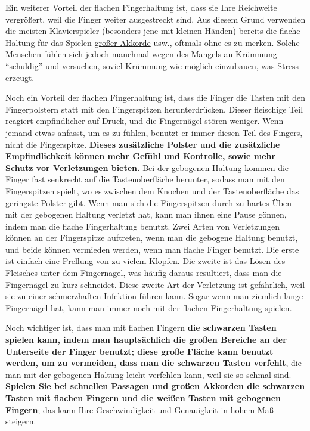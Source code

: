 Ein weiterer Vorteil der flachen Fingerhaltung ist, dass sie Ihre Reichweite vergrößert, weil die Finger weiter ausgestreckt sind.
Aus diesem Grund verwenden die meisten Klavierspieler (besonders jene mit kleinen Händen) bereits die flache Haltung für das Spielen \hyperref[c1iii7e]{großer Akkorde} usw., oftmals ohne es zu merken.
Solche Menschen fühlen sich jedoch manchmal wegen des Mangels an Krümmung \enquote{schuldig} und versuchen, soviel Krümmung wie möglich einzubauen, was Stress erzeugt.

Noch ein Vorteil der flachen Fingerhaltung ist, dass die Finger die Tasten mit den Fingerpolstern statt mit den Fingerspitzen herunterdrücken.
Dieser fleischige Teil reagiert empfindlicher auf Druck, und die Fingernägel stören weniger.
Wenn jemand etwas anfasst, um es zu fühlen, benutzt er immer diesen Teil des Fingers, nicht die Fingerspitze.
\textbf{Dieses zusätzliche Polster und die zusätzliche Empfindlichkeit können mehr Gefühl und Kontrolle, sowie mehr Schutz vor Verletzungen bieten.}
Bei der gebogenen Haltung kommen die Finger fast senkrecht auf die Tastenoberfläche herunter, sodass man mit den Fingerspitzen spielt, wo es zwischen dem Knochen und der Tastenoberfläche das geringste Polster gibt.
Wenn man sich die Fingerspitzen durch zu hartes Üben mit der gebogenen Haltung verletzt hat, kann man ihnen eine Pause gönnen, indem man die flache Fingerhaltung benutzt.
Zwei Arten von Verletzungen können an der Fingerspitze auftreten, wenn man die gebogene Haltung benutzt, und beide können vermieden werden, wenn man flache Finger benutzt.
Die erste ist einfach eine Prellung von zu vielem Klopfen.
Die zweite ist das Lösen des Fleisches unter dem Fingernagel, was häufig daraus resultiert, dass man die Fingernägel zu kurz schneidet.
Diese zweite Art der Verletzung ist gefährlich, weil sie zu einer schmerzhaften Infektion führen kann.
Sogar wenn man ziemlich lange Fingernägel hat, kann man immer noch mit der flachen Fingerhaltung spielen.

Noch wichtiger ist, dass man mit flachen Fingern \textbf{die schwarzen Tasten spielen kann, indem man hauptsächlich die großen Bereiche an der Unterseite der Finger benutzt; diese große Fläche kann benutzt werden, um zu vermeiden, dass man die schwarzen Tasten verfehlt}, die man mit der gebogenen Haltung leicht verfehlen kann, weil sie so schmal sind.
\textbf{Spielen Sie bei schnellen Passagen und großen Akkorden die schwarzen Tasten mit flachen Fingern und die weißen Tasten mit gebogenen Fingern}; das kann Ihre Geschwindigkeit und Genauigkeit in hohem Maß steigern.

